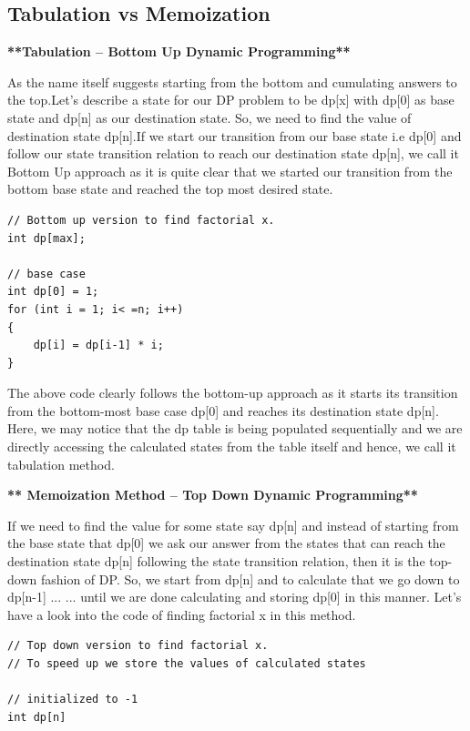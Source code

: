 \documentclass[12pt]{article}
\begin{document}
{\subsection {Tabulation vs Memoization}
\begin{center} \textbf{**Tabulation – Bottom Up Dynamic Programming**} \end{center}
As the name itself suggests starting from the bottom and cumulating answers to the top.Let’s describe a state for our DP problem to be dp[x] with dp[0] as base state and dp[n] as our destination state. So,  we need to find the value of destination state  dp[n].If we start our transition from our base state i.e dp[0] and follow our state transition relation to reach our destination state dp[n], we call it Bottom Up approach as it is quite clear that we started our transition from the bottom base state and reached the top most desired state.
\vspace{3mm}
\begin{lstlisting}
// Bottom up version to find factorial x.
int dp[max];

// base case
int dp[0] = 1;
for (int i = 1; i< =n; i++)
{
    dp[i] = dp[i-1] * i;
}
\end{lstlisting}
The above code clearly follows the bottom-up approach as it starts its transition from the bottom-most base case dp[0] and reaches its destination state dp[n]. Here, we may notice that the dp table is being populated sequentially and we are directly accessing the calculated states from the table itself and hence, we call it tabulation method.
\vspace{3mm}
\begin{center} \textbf{** Memoization Method – Top Down Dynamic Programming**} \end{center}
If we need to find the value for some state say dp[n] and instead of starting from the base state that  dp[0] we ask our answer from the states that can reach the destination state dp[n] following the state transition relation, then it is the top-down fashion of DP. So, we start from dp[n] and to calculate that we go down to dp[n-1] ... ... until we are done calculating and storing dp[0] in this manner. Let's have a look into the code of finding factorial x in this method.
\vspace{3mm}
\begin{lstlisting}
// Top down version to find factorial x.
// To speed up we store the values of calculated states

// initialized to -1
int dp[n]


\end{lstlisting}}
\end{document}
